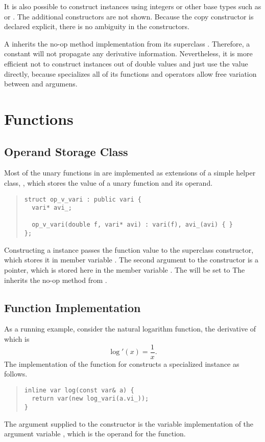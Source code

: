 \documentclass[10pt]{article}
\begin{document}
It is also possible to construct instances using integers or other
base types such as  or .  The
additional constructors are not shown.  Because the copy constructor
is declared explicit, there is no ambiguity in the constructors.

A  inherits the no-op  method implementation
from its superclass .  Therefore, a constant will not
propagate any derivative information.  Nevertheless, it is more
efficient not to construct  instances out of double values
and just use the  value directly, because
 specializes all of its functions and operators
allow free variation between  and  argumens.


\section{Functions}

\subsection{Operand Storage Class}

Most of the unary functions in  are implemented as
extensions of a simple helper class, , which stores
the value of a unary function and its operand.  
%
\begin{quote}
\begin{Verbatim}
struct op_v_vari : public vari {
  vari* avi_;

  op_v_vari(double f, vari* avi) : vari(f), avi_(avi) { }
};
\end{Verbatim}
\end{quote}
%
Constructing a  instance passes the function value
 to the superclass constructor, which stores it in member
variable .  The second argument to the constructor is a
 pointer, which is stored here in the member variable
.  The  will be set to The 
inherits the no-op  method from .

\subsection{Function Implementation}

As a running example, consider the natural logarithm function, the
derivative of which is
%
\[
\log'(x) = \frac{1}{x}.
\]
%
The implementation of the  function for 
constructs a specialized  instance as follows.
%
\begin{quote}
\begin{Verbatim}
inline var log(const var& a) {
  return var(new log_vari(a.vi_));
}
\end{Verbatim}
\end{quote}
%
The argument  supplied to the constructor is the variable
implementation of the argument variable , which is the operand
for the  function.
\end{document}
